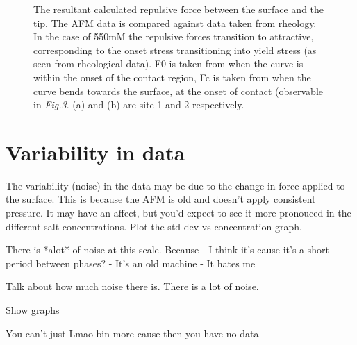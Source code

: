 \begin{figure}[!tbph!!!]
  \centering
  \hfill
  \caption{The resultant calculated repulsive force between the surface and the tip. The AFM data is compared against data taken from rheology. In the case of 550mM the repulsive forces transition to attractive, corresponding to the onset stress transitioning into yield stress (as seen from rheological data). F0 is taken from when the curve is within the onset of the contact region, Fc is taken from when the curve bends towards the surface, at the onset of contact (observable in \textit{Fig.3}. (a) and (b) are site 1 and 2 respectively\cite{John}.}
\end{figure}

\section{Variability in data}

The variability (noise) in the data may be due to the change in force applied to the surface. This is because the AFM is old and doesn't apply consistent pressure. It may have an affect, but you'd expect to see it more pronouced in the different salt concentrations. Plot the std dev vs concentration graph.

There is *alot* of noise at this scale. Because 
- I think it's cause it's a short period between phases?
- It's an old machine
- It hates me

Talk about how much noise there is. There is a lot of noise.

Show graphs

You can't just Lmao bin more cause then you have no data

